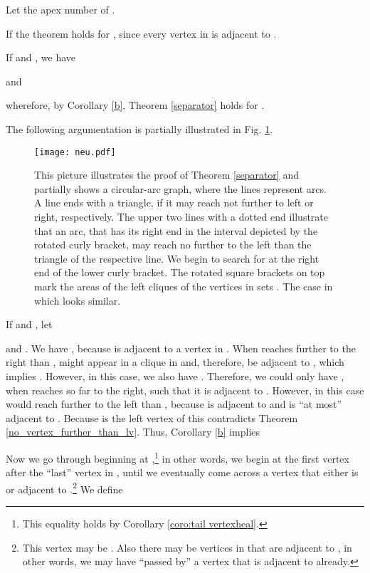 \documentclass[10pt]{article}
\newenvironment{proof}{\noindent{\bf Proof~}}{\null\hfill \par\medskip}
\newcommand{\q}[1]{``#1''}\newcommand{\fu}[1]{\mathcal{#1}}\newcommand{\mc}[1]{\mathsf{#1}}\newcommand{\ri}[1]{\mathscr{#1}}\newcommand{\co}[1]{\fu{C}({#1})}\newcommand{\lc}[1]{\alpha(#1)}\newcommand{\rc}[1]{\beta(#1)}\newcommand{\ema}[1]{\mathcal{#1}}\newcommand{\fe}[2]{\fu{F}(#1,#2)}\newcommand{\lv}[1]{l_{#1}}\newcommand{\rv}[1]{r_{#1}}\newcommand{\mv}[1]{m_{#1}}\newcommand{\lvv}{\lv{v}}
\begin{document}
\begin{proof}
Let  the apex number of .

If  the theorem holds for , since every vertex in 
 is adjacent to .

If  and , we have

and

wherefore, by Corollary \ref{b}, Theorem \ref{separator} holds for .



The following argumentation is partially illustrated in Fig. \ref{neu}.
\begin{figure}[t]
\begin{center}
\texttt{[image: neu.pdf]}
\end{center}
\caption{
This picture illustrates the proof of Theorem \ref{separator} and partially shows a 
circular-arc graph, where the lines represent arcs.
A line ends with a triangle, if it may reach not further to left or right, respectively.
The upper two lines with a dotted end illustrate that an arc, that has its right end in 
the interval depicted by the rotated 
curly bracket, may reach no further to the left than the triangle of the respective line.
We begin to search for  at the right end of the lower curly bracket.
The rotated square brackets on top mark the areas of the left cliques of 
the vertices in sets .
The case in which  looks similar.
}
\label{neu}
\end{figure}





If  and , let

and .
We have , because  is adjacent to a vertex 
in .
When  reaches further to the right than ,  might appear in a clique in  and, therefore, be adjacent to , which implies .
However, in this case, we also have . Therefore, we could only have , when  reaches so far to the right, such that it is adjacent to .
However, in this case  would reach further to the left than , because  is adjacent to  and  is \q{at most} adjacent to .
Because  is the left vertex of  this contradicts Theorem \ref{no_vertex_further_than_lv}.
Thus, Corollary \ref{b} implies 



Now we go through  beginning at 
,\footnote{This 
equality holds by Corollary \ref{coro:tail vertexheal}.} in other 
words, we begin at the first vertex after the \q{last} vertex in  , until we 
eventually come across a vertex  that either is  or adjacent 
to .\footnote{This vertex 
 may be . Also there may be vertices in  that are adjacent to 
, in other words, we may have \q{passed by} a vertex that is 
adjacent to  already.}
We define


\end{proof}
\end{document}
